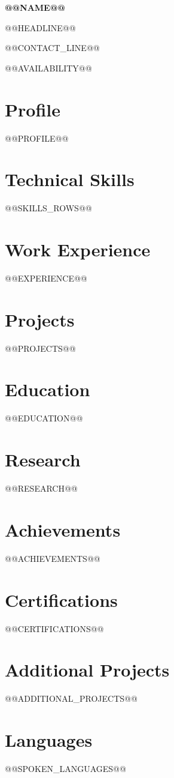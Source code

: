 \documentclass[a4paper,10pt]{article}
\begin{document}
\begin{center}
  {\LARGE\bfseries @@NAME@@}\par\vspace{3pt}
  {\large @@HEADLINE@@}\par\vspace{3pt}
  {\small @@CONTACT_LINE@@}\par\vspace{2pt}
  {\small @@AVAILABILITY@@}\par
\end{center}

\section*{Profile}
@@PROFILE@@\par

\section*{Technical Skills}
\begin{itemize}
@@SKILLS_ROWS@@
\end{itemize}

\section*{Work Experience}
@@EXPERIENCE@@

\section*{Projects}
@@PROJECTS@@

\section*{Education}
@@EDUCATION@@

\section*{Research}
\begin{itemize}
@@RESEARCH@@
\end{itemize}

\section*{Achievements}
\begin{itemize}
@@ACHIEVEMENTS@@
\end{itemize}

\section*{Certifications}
\begin{itemize}
@@CERTIFICATIONS@@
\end{itemize}

\section*{Additional Projects}
\begin{itemize}
@@ADDITIONAL_PROJECTS@@
\end{itemize}

\section*{Languages}
@@SPOKEN_LANGUAGES@@\par
\end{document}
